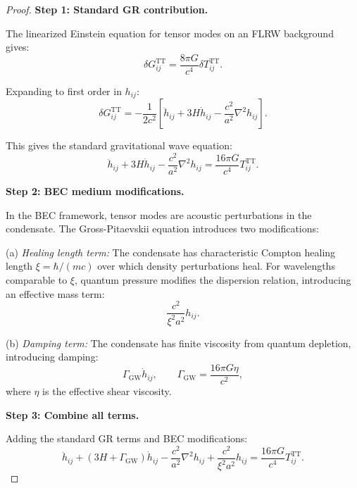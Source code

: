\documentclass[11pt,a4paper]{article}
\theoremstyle{definition}
\theoremstyle{remark}
\begin{document}
\begin{proof}
\textbf{Step 1: Standard GR contribution.}

The linearized Einstein equation for tensor modes on an FLRW background gives:
\begin{equation}
\delta G_{ij}^{\mathrm{TT}} = \frac{8\pi G}{c^4}\delta T_{ij}^{\mathrm{TT}}.
\end{equation}

Expanding to first order in $h_{ij}$:
\begin{equation}
\delta G_{ij}^{\mathrm{TT}} = -\frac{1}{2c^2}\left[\ddot{h}_{ij} + 3H\dot{h}_{ij} - \frac{c^2}{a^2}\nabla^2 h_{ij}\right].
\end{equation}

This gives the standard gravitational wave equation:
\begin{equation}
\ddot{h}_{ij} + 3H\dot{h}_{ij} - \frac{c^2}{a^2}\nabla^2 h_{ij} = \frac{16\pi G}{c^4}T_{ij}^{\mathrm{TT}}.
\end{equation}

\textbf{Step 2: BEC medium modifications.}

In the BEC framework, tensor modes are acoustic perturbations in the condensate. The Gross-Pitaevskii equation introduces two modifications:

(a) \emph{Healing length term:} The condensate has characteristic Compton healing length $\xi = \hbar/(mc)$ over which density perturbations heal. For wavelengths comparable to $\xi$, quantum pressure modifies the dispersion relation, introducing an effective mass term:
\begin{equation}
\frac{c^2}{\xi^2 a^2}h_{ij}.
\end{equation}

(b) \emph{Damping term:} The condensate has finite viscosity from quantum depletion, introducing damping:
\begin{equation}
\Gamma_{\mathrm{GW}}\dot{h}_{ij}, \qquad \Gamma_{\mathrm{GW}} = \frac{16\pi G\eta}{c^2},
\end{equation}
where $\eta$ is the effective shear viscosity.

\textbf{Step 3: Combine all terms.}

Adding the standard GR terms and BEC modifications:
\begin{equation}
\ddot{h}_{ij} + (3H + \Gamma_{\mathrm{GW}})\dot{h}_{ij} - \frac{c^2}{a^2}\nabla^2 h_{ij} + \frac{c^2}{\xi^2 a^2}h_{ij} = \frac{16\pi G}{c^4}T_{ij}^{\mathrm{TT}}.
\end{equation}
\end{proof}
\end{document}
